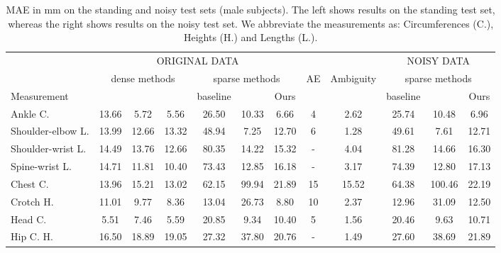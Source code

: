 \begin{table}[t!]
\scriptsize
\begin{center}
\caption{MAE in mm on the standing and noisy test sets (male subjects). The left shows results on the standing test set, whereas the right shows results on the noisy test set. We abbreviate the measurements as: Circumferences (C.), Heights (H.) and Lengths (L.).} 
\label{tab:caesar-stand-male-res}
\begin{tabular}{|l|c|c|c|c|c|c|c|c|c|c|c|}
\cline{2-7} \cline{10-12}
      \multicolumn{1}{c|}{}     & \multicolumn{6}{c|}{ORIGINAL DATA}    &    \multicolumn{2}{c|}{} & \multicolumn{3}{c|}{NOISY DATA} \\
\cline{2-12}
      \multicolumn{1}{c|}{}     & \multicolumn{3}{c|}{dense methods}           & \multicolumn{3}{c|}{sparse methods}  &  {\tiny AE} & \multirow{ 2}{*}{\tiny Ambiguity} &  \multicolumn{3}{c|}{sparse methods} \\ 
\cline{1-7}  \cline{10-12}
Measurement              & {\tiny \cite{anthroscan}} & {\tiny \cite{scan-db}} & {\tiny \cite{tsoli-mode-based-anthropometry}} & {\tiny baseline} & {\tiny \cite{bojanic_VISAPP24}} & {\tiny Ours}  & {\tiny \cite{AE}} & & {\tiny baseline} & {\tiny \cite{bojanic_VISAPP24}} & {\tiny Ours} \\ \hline
Ankle C.     & 13.66   & 5.72    & 5.56 &  26.50   & 10.33 & 6.66               & 4     & 2.62  &25.74&10.48& 6.96  \\ 
Shoulder-elbow L. & 13.99   & 12.66   & 13.32 & 48.94   & 7.25 & 12.70          & 6   & 1.28  &49.61&7.61&  12.71   \\ 
Shoulder-wrist L. & 14.49   & 13.76   & 12.66 & 80.35   & 14.22 & 15.32         & -  & 4.04  &81.28&14.66& 16.30 \\ 
Spine-wrist L.  & 14.71   & 11.81   & 10.40 & 73.43   & 12.85 & 16.18           & -   & 3.17   &74.39&12.80&  17.13  \\ 
Chest C.   & 13.96   & 15.21   & 13.02 & 62.15   & 99.94 & 21.89                & 15    & 15.52   &64.38&100.46& 22.19 \\ 
Crotch H. & 11.01   & 9.77    & 8.36 & 13.04    & 26.73 & 8.80                  & 10     & 2.37  &12.96&31.09& 12.50 \\ 
Head C.    & 5.51    & 7.46    & 5.59 & 20.85    & 9.34 & 10.40                 & 5     & 1.56   &20.46&9.63& 10.71 \\ 
Hip C. H. & 16.50   & 18.89   & 19.05 & 27.32   & 37.80 & 20.76                 & -    & 1.49   &27.60&38.69& 21.89  \\ 

\end{tabular}
\end{center}
\end{table}
